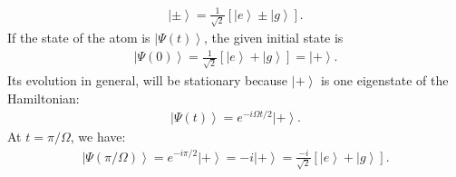 \documentclass[letterpaper,11pt,twoside]{article}
\newcommand{\ket}[1]{\left|#1\right\rangle}
\begin{document}
\begin{enumerate}[itemsep=0pt,topsep=0pt,parsep=0pt,label=\alph*)]
  \begin{align*}
    \ket{\pm}=\frac{1}{\sqrt{2}}[\ket{e}\pm\ket{g}].
  \end{align*}
  If the state of the atom is $\ket{\Psi(t)}$, the given initial state is 
  \begin{align*}
    \ket{\Psi(0)}=\frac{1}{\sqrt{2}}[\ket{e}+\ket{g}]=\ket{+}.
  \end{align*}
  Its evolution in general, will be stationary because $\ket{+}$ is one eigenstate of the Hamiltonian:
  \begin{align*}
    \ket{\Psi(t)}=e^{-i\Omega t/2}\ket{+}.
  \end{align*} 
  At $t=\pi/\Omega$, we have:
  \begin{align*}
    \ket{\Psi(\pi/\Omega)}=e^{-i\pi/2}\ket{+}=-i\ket{+}=\frac{-i}{\sqrt{2}}[\ket{e}+\ket{g}].
  \end{align*}
\end{enumerate}
\end{document}
